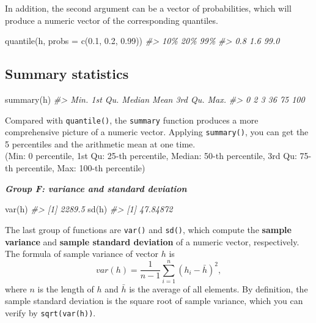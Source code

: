 \documentclass[
]{book}
\newenvironment{Shaded}{\begin{snugshade}}{\end{snugshade}}
\newcommand{\AttributeTok}[1]{\textcolor[rgb]{0.77,0.63,0.00}{#1}}
\newcommand{\CommentTok}[1]{\textcolor[rgb]{0.56,0.35,0.01}{\textit{#1}}}
\newcommand{\FloatTok}[1]{\textcolor[rgb]{0.00,0.00,0.81}{#1}}
\newcommand{\FunctionTok}[1]{\textcolor[rgb]{0.00,0.00,0.00}{#1}}
\newcommand{\NormalTok}[1]{#1}
\begin{document}
In addition, the second argument can be a vector of probabilities, which will produce a numeric vector of the corresponding quantiles.

\begin{Shaded}
\begin{Highlighting}[]
\FunctionTok{quantile}\NormalTok{(h, }\AttributeTok{probs =} \FunctionTok{c}\NormalTok{(}\FloatTok{0.1}\NormalTok{, }\FloatTok{0.2}\NormalTok{, }\FloatTok{0.99}\NormalTok{))}
\CommentTok{\#\textgreater{}  10\%  20\%  99\% }
\CommentTok{\#\textgreater{}  0.8  1.6 99.0}
\end{Highlighting}
\end{Shaded}

\hypertarget{summary-statistics}{%
\subsection{Summary statistics}\label{summary-statistics}}

\begin{Shaded}
\begin{Highlighting}[]
\FunctionTok{summary}\NormalTok{(h)}
\CommentTok{\#\textgreater{}    Min. 1st Qu.  Median    Mean 3rd Qu.    Max. }
\CommentTok{\#\textgreater{}       0       2       3      36      75     100}
\end{Highlighting}
\end{Shaded}

Compared with \texttt{quantile()}, the \texttt{summary} function produces a more comprehensive picture of a numeric vector. Applying \texttt{summary()}, you can get the 5 percentiles and the arithmetic mean at one time.\\
(Min: 0 percentile, 1st Qu: 25-th percentile, Median: 50-th percentile, 3rd Qu: 75-th percentile, Max: 100-th percentile)

\textbf{\emph{Group F: variance and standard deviation}}

\begin{Shaded}
\begin{Highlighting}[]
\FunctionTok{var}\NormalTok{(h)}
\CommentTok{\#\textgreater{} [1] 2289.5}
\FunctionTok{sd}\NormalTok{(h)}
\CommentTok{\#\textgreater{} [1] 47.84872}
\end{Highlighting}
\end{Shaded}

The last group of functions are \texttt{var()} and \texttt{sd()}, which compute the \textbf{sample variance} and \textbf{sample standard deviation} of a numeric vector, respectively. The formula of sample variance of vector \(h\) is \[var(h) = \frac{1}{n-1}\sum_{i=1}^n (h_i-\bar h)^2,\] where \(n\) is the length of \(h\) and \(\bar h\) is the average of all elements. By definition, the sample standard deviation is the square root of sample variance, which you can verify by \texttt{sqrt(var(h))}.
\end{document}
